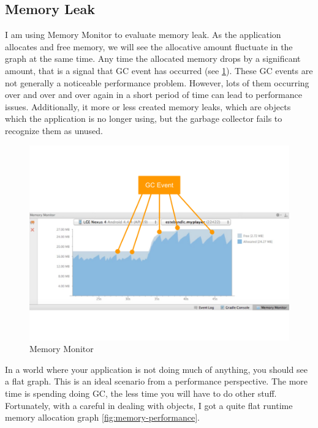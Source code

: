 \subsection{Memory Leak}

I am using Memory Monitor to evaluate memory leak. As the application allocates and free memory, we will see the allocative amount fluctuate in the graph at the same time. Any time the allocated memory drops by a significant amount, that is a signal that GC event has occurred (see \ref{fig:memory-monitor}). These GC events are not generally a noticeable performance problem. However, lots of them occurring over and over and over again in a short period of time can lead to performance issues. Additionally, it more or less created memory leaks, which are objects which the application is no longer using, but the garbage collector fails to recognize them as unused.

\begin{figure}[H]
	\caption{Memory Monitor \cite{google.memory-monitor.2015}}
	\label{fig:memory-monitor}
	\centering
	\includegraphics[width=\textwidth, keepaspectratio]{Figures/memory-monitor.png}
	\decoRule
\end{figure}

In a world where your application is not doing much of anything, you should see a flat graph. This is an ideal scenario from a performance perspective. The more time is spending doing GC, the less time you will have to do other stuff. Fortunately, with a careful in dealing with objects, I got a quite flat runtime memory allocation graph \ref{fig:memory-performance}.

